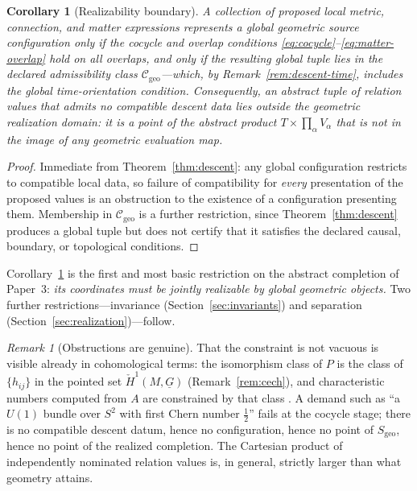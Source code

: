 \documentclass[11pt,a4paper]{article}
\theoremstyle{plain}
\newtheorem{corollary}[theorem]{Corollary}
\theoremstyle{definition}
\theoremstyle{remark}
\newtheorem{remark}[theorem]{Remark}
\newcommand{\Cgeo}{\mathcal{C}_{\mathrm{geo}}}
\newcommand{\Sgeo}{S_{\mathrm{geo}}}
\begin{document}
\begin{corollary}[Realizability boundary]
\label{cor:realizability-boundary}
A collection of proposed local metric, connection, and matter expressions represents a global
geometric source configuration only if the cocycle and overlap conditions
\eqref{eq:cocycle}--\eqref{eq:matter-overlap} hold on all overlaps, and only if the resulting
global tuple lies in the declared admissibility class $\Cgeo$---which, by
Remark~\ref{rem:descent-time}, includes the global time-orientation condition. Consequently, an
abstract tuple of relation values that admits no compatible descent data lies outside the
geometric realization domain: it is a point of the abstract product
$T\times\prod_\alpha V_\alpha$ that is not in the image of any geometric evaluation map.
\end{corollary}

\begin{proof}
Immediate from Theorem~\ref{thm:descent}: any global configuration restricts to compatible local
data, so failure of compatibility for \emph{every} presentation of the proposed values is an
obstruction to the existence of a configuration presenting them. Membership in $\Cgeo$ is a
further restriction, since Theorem~\ref{thm:descent} produces a global tuple but does not certify
that it satisfies the declared causal, boundary, or topological conditions.
\end{proof}

Corollary~\ref{cor:realizability-boundary} is the first and most basic restriction on the abstract
completion of Paper~3: \emph{its coordinates must be jointly realizable by global geometric
objects.} Two further restrictions---invariance (Section~\ref{sec:invariants}) and separation
(Section~\ref{sec:realization})---follow.

\begin{remark}[Obstructions are genuine]
\label{rem:obstruction-genuine}
That the constraint is not vacuous is visible already in cohomological terms: the isomorphism
class of $P$ is the class of $\{h_{ij}\}$ in the pointed set $\check H^1(M,\underline{G})$
(Remark~\ref{rem:cech}), and characteristic numbers computed from $A$ are constrained by that
class \cite{ChernWeil,MilnorStasheff}. A demand such as ``a $U(1)$ bundle over $S^2$ with first
Chern number $\tfrac12$'' fails at the cocycle stage; there is no compatible descent datum, hence
no configuration, hence no point of $\Sgeo$, hence no point of the realized completion. The
Cartesian product of independently nominated relation values is, in general, strictly larger than
what geometry attains.
\end{remark}
\end{document}
